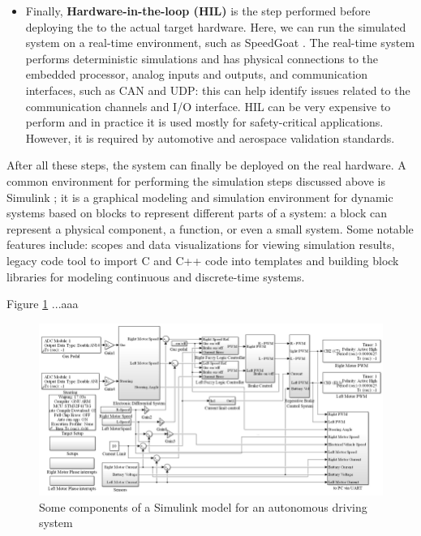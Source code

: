 \begin{itemize}
    \item Finally, \textbf{Hardware-in-the-loop (HIL)} is the step performed before deploying the \es to the actual target hardware. Here, we can run the simulated system on a real-time environment, such as SpeedGoat \cite{SpeedGoat}. The real-time system performs deterministic simulations and has physical connections to the embedded processor, \ie analog inputs and outputs, and communication interfaces, such as CAN and UDP: this can help identify issues related to the communication channels and I/O interface. HIL can be very expensive to perform and in practice it is used mostly for safety-critical applications. However, it is required by automotive and aerospace validation standards. 
\end{itemize}

After all these steps, the system can finally be deployed on the real hardware. A common environment for performing the simulation steps discussed above is Simulink \cite{Simulink}; it is a graphical modeling and simulation environment for dynamic systems based on blocks to represent different parts of a system: a block can represent a physical component, a function, or even a small system. Some notable features include: scopes and data visualizations for viewing simulation results, legacy code tool to import C and C++ code into templates and building block libraries for modeling continuous and discrete-time systems.

Figure \ref{simulink_model} ...aaa

\begin{figure}[H]
    \centering
    \includegraphics[width=\linewidth]{figures/simulink_model.png}
    \caption{Some components of a Simulink model for an autonomous driving system}
    \label{simulink_model}
\end{figure}



